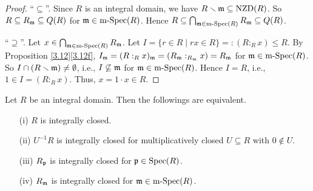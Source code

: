 \begin{proof}
    ``$\subseteq$''. Since $R$ is an integral domain, we have $R \smallsetminus \mathfrak{m} \subseteq \operatorname{NZD}(R)$. So $R \subseteq R_{\mathfrak{m}} \subseteq Q(R)$ for $\mathfrak{m} \in \operatorname{m-Spec}(R)$. Hence $R \subseteq \bigcap_{\mathfrak{m} \in \operatorname{m-Spec}(R)}R_{\mathfrak{m}} \subseteq Q(R)$. \par 
    ``$\supseteq$''. Let $x \in \bigcap_{\mathfrak{m} \in \operatorname{m-Spec}(R)}R_{\mathfrak{m}}$. Let $I = \{r \in R \mid rx \in R\} =: (R:_Rx) \leq R$. By Proposition \ref{3.12}\ref{3.12f}, $I_{\mathfrak{m}} = (R:_Rx)_{\mathfrak{m}} = (R_{\mathfrak{m}}:_{R_{\mathfrak{m}}}x) = R_{\mathfrak{m}}$ for $\mathfrak{m} \in \operatorname{m-Spec}(R)$. So $I \cap (R \smallsetminus \mathfrak{m}) \neq \emptyset$, i.e., $I \not\subseteq \mathfrak{m}$ for $\mathfrak{m} \in \operatorname{m-Spec}(R)$. Hence $I = R$, i.e., $1 \in I = (R:_Rx)$. Thus, $x = 1 \cdot x \in R$. 
\end{proof}

\begin{proposition}\label{5.34}
    Let $R$ be an integral domain. Then the followings are equivalent.
    \begin{enumerate}
        \item[(i)] $R$ is integrally closed.
        \item[(ii)] $U^{-1}R$ is integrally closed for multiplicatively closed $U \subseteq R$ with $0 \not \in U$.
        \item[(iii)] $R_{\mathfrak{p}}$ is integrally closed for $\mathfrak{p} \in \operatorname{Spec}(R)$.
        \item[(iv)] $R_{\mathfrak{m}}$ is integrally closed for $\mathfrak{m} \in \operatorname{m-Spec}(R)$.
    \end{enumerate}
\end{proposition}

